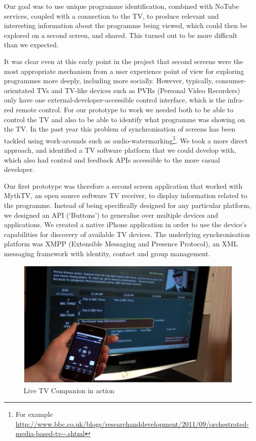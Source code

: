 \documentclass{notube}
\begin{document}
Our goal was to use unique programme identification, combined with NoTube services, coupled with a connection to the TV, to produce relevant and interesting information about the programme being viewed, which could then be explored on a second screen, and shared. This turned out to be more difficult than we expected.

It was clear even at this early point in the project that second screens were the most appropriate mechanism from a user experience point of view for exploring programmes more deeply, including more socially. However, typically, consumer-orientated TVs and TV-like devices such as PVRs (Personal Video Recorders) only have one external-developer-accessible control interface, which is the infra-red remote control. For our prototype to work we needed both to be able to control the TV and also to be able to identify what programme was showing on the TV. In the past year this problem of synchronisation of screens has been tackled using work-arounds such as audio-watermarking\footnote{For example \url{http://www.bbc.co.uk/blogs/researchanddevelopment/2011/09/orchestrated-media-based-tv--.shtml}}. We took a more direct approach, and identified a TV software platform that we could develop with, which also had control and feedback APIs accessible to the more casual developer.

Our first prototype was therefore a second screen application that worked with MythTV, an open source software TV receiver, to display information related to the programme. Instead of being specifically designed for any particular platform, we designed an API (`Buttons') to generalise over multiple devices and applications. We created a native iPhone application in order to use the device's capabilities for discovery of available TV devices. The underlying synchronisation platform was XMPP (Extensible Messaging and Presence Protocol), an XML messaging framework with identity, contact and group management. 

\begin{figure}[htbp]
\begin{center}
\includegraphics[width=6in]{images/year1.png}
\caption{Live TV Companion in action} \label{fig:year1}
\end{center}
\end{figure} 
\end{document}
